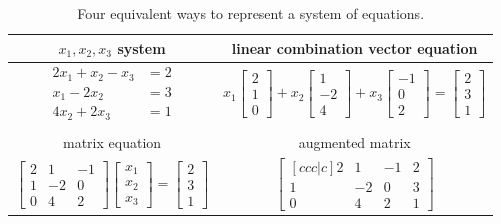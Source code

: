 \begin{table}
\begin{tabular}{cc}
 $x_1,x_2,x_3$ system& linear combination vector equation
\\\hline\hline
$\begin{array}{rl}
2x_1+x_2-x_3&=2\\
x_1-2x_2 &=3\\
4x_2+2x_3&=1
\end{array}$
&
$ x_1\begin{bmatrix}2\\1\\0\end{bmatrix} 
+ x_2\begin{bmatrix}1\\-2\\4\end{bmatrix} 
+ x_3\begin{bmatrix}-1\\0\\2\end{bmatrix} 
=\begin{bmatrix} 2\\3\\1\end{bmatrix} 
$
\\
\\
matrix equation & augmented matrix
\\\hline\hline
$ \begin{bmatrix}2&1&-1\\1&-2&0 \\0&4&2\end{bmatrix} 
\begin{bmatrix} x_{{1}}\\x_{{2}}\\x_{{3}}\end{bmatrix}
=\begin{bmatrix} 2\\3\\1\end{bmatrix} 
$
&
$\begin{bmatrix}[ccc|c]2&1&-1 &2\\1&-2&0 &3 \\0&4&2&1\end{bmatrix}$ 
\end{tabular}
\caption{Four equivalent ways to represent a system of equations.\label{systemequivalent}}
\end{table}

